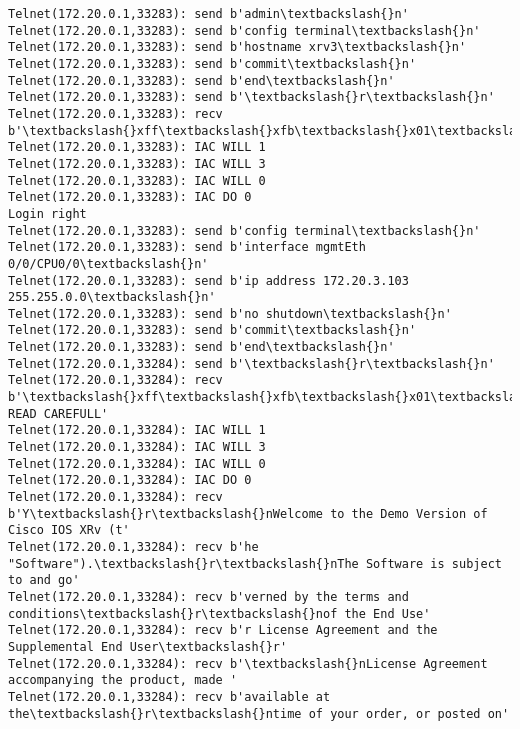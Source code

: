 \documentclass[11pt]{article}
\begin{document}
\begin{Verbatim}[commandchars=\\\{\}]
Telnet(172.20.0.1,33283): send b'admin\textbackslash{}n'
Telnet(172.20.0.1,33283): send b'config terminal\textbackslash{}n'
Telnet(172.20.0.1,33283): send b'hostname xrv3\textbackslash{}n'
Telnet(172.20.0.1,33283): send b'commit\textbackslash{}n'
Telnet(172.20.0.1,33283): send b'end\textbackslash{}n'
Telnet(172.20.0.1,33283): send b'\textbackslash{}r\textbackslash{}n'
Telnet(172.20.0.1,33283): recv b'\textbackslash{}xff\textbackslash{}xfb\textbackslash{}x01\textbackslash{}xff\textbackslash{}xfb\textbackslash{}x03\textbackslash{}xff\textbackslash{}xfb\textbackslash{}x00\textbackslash{}xff\textbackslash{}xfd\textbackslash{}x00\textbackslash{}x1b]0;xrv3\textbackslash{}x07\textbackslash{}r\textbackslash{}n\textbackslash{}rRP/0/0/CPU0:xrv3\#\textbackslash{}r\textbackslash{}n\textbackslash{}rRP/0/0'
Telnet(172.20.0.1,33283): IAC WILL 1
Telnet(172.20.0.1,33283): IAC WILL 3
Telnet(172.20.0.1,33283): IAC WILL 0
Telnet(172.20.0.1,33283): IAC DO 0
Login right
Telnet(172.20.0.1,33283): send b'config terminal\textbackslash{}n'
Telnet(172.20.0.1,33283): send b'interface mgmtEth 0/0/CPU0/0\textbackslash{}n'
Telnet(172.20.0.1,33283): send b'ip address 172.20.3.103 255.255.0.0\textbackslash{}n'
Telnet(172.20.0.1,33283): send b'no shutdown\textbackslash{}n'
Telnet(172.20.0.1,33283): send b'commit\textbackslash{}n'
Telnet(172.20.0.1,33283): send b'end\textbackslash{}n'
Telnet(172.20.0.1,33284): send b'\textbackslash{}r\textbackslash{}n'
Telnet(172.20.0.1,33284): recv b'\textbackslash{}xff\textbackslash{}xfb\textbackslash{}x01\textbackslash{}xff\textbackslash{}xfb\textbackslash{}x03\textbackslash{}xff\textbackslash{}xfb\textbackslash{}x00\textbackslash{}xff\textbackslash{}xfd\textbackslash{}x00\textbackslash{}x1b]0;xrv4\textbackslash{}x07\textbackslash{}r\textbackslash{}n\textbackslash{}r\textbackslash{}nIMPORTANT:  READ CAREFULL'
Telnet(172.20.0.1,33284): IAC WILL 1
Telnet(172.20.0.1,33284): IAC WILL 3
Telnet(172.20.0.1,33284): IAC WILL 0
Telnet(172.20.0.1,33284): IAC DO 0
Telnet(172.20.0.1,33284): recv b'Y\textbackslash{}r\textbackslash{}nWelcome to the Demo Version of Cisco IOS XRv (t'
Telnet(172.20.0.1,33284): recv b'he "Software").\textbackslash{}r\textbackslash{}nThe Software is subject to and go'
Telnet(172.20.0.1,33284): recv b'verned by the terms and conditions\textbackslash{}r\textbackslash{}nof the End Use'
Telnet(172.20.0.1,33284): recv b'r License Agreement and the Supplemental End User\textbackslash{}r'
Telnet(172.20.0.1,33284): recv b'\textbackslash{}nLicense Agreement accompanying the product, made '
Telnet(172.20.0.1,33284): recv b'available at the\textbackslash{}r\textbackslash{}ntime of your order, or posted on'

\end{Verbatim}
\end{document}
